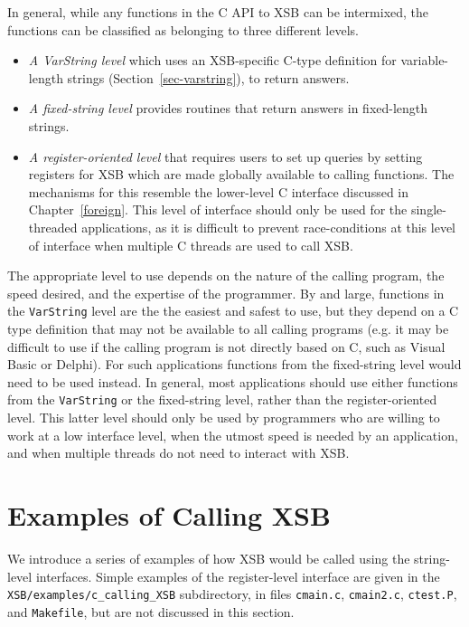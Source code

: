 In general, while any functions in the C API to XSB can be intermixed,
the functions can be classified as belonging to three different
levels.
%
\begin{itemize}
\item {\em A VarString level} which uses an XSB-specific C-type
  definition for variable-length strings
  (Section~\ref{sec-varstring}), to return answers.
%
\item {\em A fixed-string level} provides routines that return answers
  in fixed-length strings.
%
\item {\em A register-oriented level} that requires users to set up
  queries by setting registers for XSB which are made globally
  available to calling functions.  The mechanisms for this resemble
  the lower-level C interface discussed in Chapter~\ref{foreign}.
  This level of interface should only be used for the single-threaded
  applications, as it is difficult to prevent race-conditions at this
  level of interface when multiple C threads are used to call XSB.

\end{itemize}
%
The appropriate level to use depends on the nature of the calling
program, the speed desired, and the expertise of the programmer.  By
and large, functions in the {\tt VarString} level are the the easiest
and safest to use, but they depend on a C type definition that may not
be available to all calling programs (e.g. it may be difficult to use
if the calling program is not directly based on C, such as Visual
Basic or Delphi).  For such applications functions from the
fixed-string level would need to be used instead.  In general, most
applications should use either functions from the {\tt VarString} or
the fixed-string level, rather than the register-oriented level.  This
latter level should only be used by programmers who are willing to
work at a low interface level, when the utmost speed is needed by an
application, and when multiple threads do not need to interact with
XSB.


\section{Examples of Calling XSB}

We introduce a series of examples of how XSB would be called using the
string-level interfaces.  Simple examples of the register-level
interface are given in the {\tt XSB/examples/c\_calling\_XSB}
subdirectory, in files {\tt cmain.c}, {\tt cmain2.c}, {\tt ctest.P},
and {\tt Makefile}, but are not discussed in this section.

